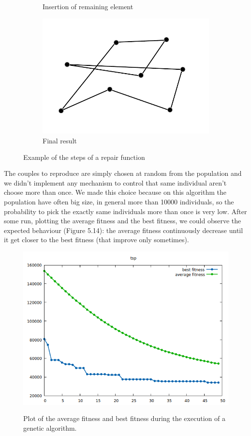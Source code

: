 \begin{figure}[h!]
\begin{subfigure}[b]{0.49\linewidth}
    \caption{Insertion of remaining element}
  \end{subfigure}
  \begin{subfigure}[b]{0.49\linewidth}
    \includegraphics[width=\linewidth]{media/gene4.pdf}
    \caption{Final result}
  \end{subfigure}
  \caption{Example of the steps of a repair function}
\end{figure}

\noindent The couples to reproduce are simply chosen at random from the population and we didn't implement any mechanism to control that same individual aren't choose more than once. We made this choice because on this algorithm the population have often big size, in general more than 10000 individuals, so the probability to pick the exactly same individuals more than once is very low.
After some run, plotting the average fitness and the best fitness, we could observe the 
expected behaviour (Figure 5.14): the average fitness continuously decrease until it get closer to the best fitness (that improve only sometimes).  \\

\begin{figure}[h!]
\centering
	\includegraphics[scale=0.6]{media/fitnessPlot.png} \\
	\caption{Plot of the average fitness and best fitness during the execution of a genetic algorithm.}
\end{figure}

